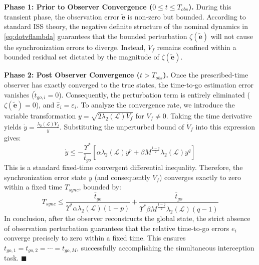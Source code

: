 \documentclass[lettersize,journal]{IEEEtran}
\begin{document}
\textbf{Phase 1: Prior to Observer Convergence ($0 \le t \le T_{obs}$).} 
During this transient phase, the observation error $\tilde{\mathbf{e}}$ is non-zero but bounded. According to standard ISS theory, the negative definite structure of the nominal dynamics in \eqref{eq:dotvflambda} guarantees that the bounded perturbation $\zeta(\tilde{\mathbf{e}})$ will not cause the synchronization errors to diverge. Instead, $V_f$ remains confined within a bounded residual set dictated by the magnitude of $\zeta(\tilde{\mathbf{e}})$.

\textbf{Phase 2: Post Observer Convergence ($t > T_{obs}$).} 
Once the prescribed-time observer has exactly converged to the true states, the time-to-go estimation error vanishes ($\tilde{t}_{go,i} = 0$). Consequently, the perturbation term is entirely eliminated ($\zeta(\tilde{\mathbf{e}}) = 0$), and $\hat{\varepsilon}_i = \varepsilon_i$. To analyze the convergence rate, we introduce the variable transformation $y = \sqrt{2\lambda_2(\mathcal{L}) V_f}$ for $V_f \neq 0$. Taking the time derivative yields $\dot{y} = \frac{\lambda_2(\mathcal{L})\dot{V}_f}{y}$. Substituting the unperturbed bound of $\dot{V}_f$ into this expression gives:
\begin{equation}
	\dot{y} \leq -\frac{\Upsilon^*}{\bar{t}_{go}} \left[ \alpha \lambda_2(\mathcal{L}) y^p + \beta M^{\frac{1-q}{2}} \lambda_2(\mathcal{L}) y^q \right]
\end{equation}
This is a standard fixed-time convergent differential inequality. Therefore, the synchronization error state $y$ (and consequently $V_f$) converges exactly to zero within a fixed time $T_{sync}$, bounded by:
\begin{equation}
	T_{sync} \le \frac{\bar{t}_{go}}{\Upsilon^* \alpha \lambda_2(\mathcal{L})(1-p)} + \frac{\bar{t}_{go}}{\Upsilon^* \beta M^{\frac{1-q}{2}} \lambda_2(\mathcal{L})(q-1)}
\end{equation}
In conclusion, after the observer reconstructs the global state, the strict absence of observation perturbation guarantees that the relative time-to-go errors $e_i$ converge precisely to zero within a fixed time. This ensures $t_{go,1} = t_{go,2} = \cdots = t_{go,M}$, successfully accomplishing the simultaneous interception task. \hfill $\blacksquare$
\end{document}
